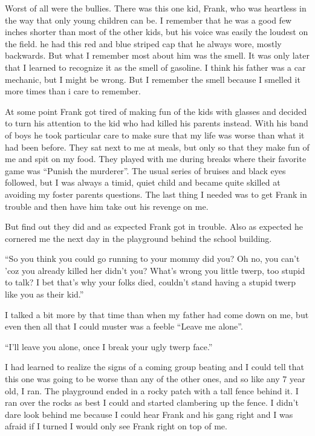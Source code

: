 \documentclass[12pt,letterpaper]{article}
\begin{document}
Worst of all were the bullies. There was this one kid, Frank, who was heartless in the way that only young children can be. I remember that he was a good few inches shorter than most of the other kids, but his voice was easily the loudest on the field. he had this red and blue striped cap that he always wore, mostly backwards. But what I remember most about him was the smell. It was only later that I learned to recognize it as the smell of gasoline. I think his father was a car mechanic, but I might be wrong. But I remember the smell because I smelled it more times than i care to remember.

At some point Frank got tired of making fun of the kids with glasses and decided to turn his attention to the kid who had killed his parents instead. With his band of boys he took particular care to make sure that my life was worse than what it had been before. They sat next to me at meals, but only so that they make fun of me and spit on my food. They played with me during breaks where their favorite game was ``Punish the murderer''. The usual series of bruises and black eyes followed, but I was always a timid, quiet child and became quite skilled at avoiding my foster parents questions. The last thing I needed was to get Frank in trouble and then have him take out his revenge on me.

But find out they did and as expected Frank got in trouble. Also as expected he cornered me the next day in the playground behind the school building.

``So you think you could go running to your mommy did you? Oh no, you can't 'coz you already killed her didn't you? What's wrong you little twerp, too stupid to talk? I bet that's why your folks died, couldn't stand having a stupid twerp like you as their kid.''

I talked a bit more by that time than when my father had come down on me, but even then all that I could muster was a feeble  ``Leave me alone''.

``I'll leave you alone, once I break your ugly twerp face.''

I had learned to realize the signs of a coming group beating and I could tell that this one was going to be worse than any of the other ones, and so like any 7 year old, I ran. The playground ended in a rocky patch with a tall fence behind it. I ran over the rocks as best I could and started clambering up the fence. I didn't dare look behind me because I could hear Frank and his gang right and I was afraid if I turned I would only see Frank right on top of me.
\end{document}
